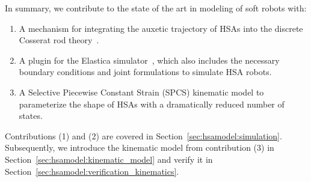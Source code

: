 In summary, we contribute to the state of the art in modeling of soft robots with:
%
\begin{enumerate}
    \item A mechanism for integrating the auxetic trajectory of \glspl{HSA} into the discrete Cosserat rod theory~\cite{gazzola2018forward, mathew2022sorosim}. %
    \item A plugin for the Elastica simulator~\cite{naughton2021elastica}, which also includes the necessary boundary conditions and joint formulations to simulate \gls{HSA} robots.
    \item A Selective Piecewise Constant Strain (SPCS) kinematic model to parameterize the shape of \glspl{HSA} with a dramatically reduced number of states. %
\end{enumerate}
Contributions (1) and (2) are covered in Section~\ref{sec:hsamodel:simulation}. Subsequently, we introduce the kinematic model from contribution (3) in Section~\ref{sec:hsamodel:kinematic_model} and verify it in Section~\ref{sec:hsamodel:verification_kinematics}.